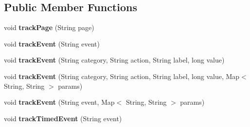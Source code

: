 \subsection*{Public Member Functions}
\begin{DoxyCompactItemize}
\item 
\hypertarget{classcom_1_1spilgames_1_1framework_1_1tracking_1_1impl_1_1_google_analytics_tracker_aa17767a7e23302cef04192a97665b6d6}{void {\bfseries track\-Page} (String page)}\label{classcom_1_1spilgames_1_1framework_1_1tracking_1_1impl_1_1_google_analytics_tracker_aa17767a7e23302cef04192a97665b6d6}

\item 
\hypertarget{classcom_1_1spilgames_1_1framework_1_1tracking_1_1impl_1_1_google_analytics_tracker_aca73bcda57495c0d6274c58d76669ced}{void {\bfseries track\-Event} (String event)}\label{classcom_1_1spilgames_1_1framework_1_1tracking_1_1impl_1_1_google_analytics_tracker_aca73bcda57495c0d6274c58d76669ced}

\item 
\hypertarget{classcom_1_1spilgames_1_1framework_1_1tracking_1_1impl_1_1_google_analytics_tracker_ac6322840330b5a35a9c22146ec5cbd1f}{void {\bfseries track\-Event} (String category, String action, String label, long value)}\label{classcom_1_1spilgames_1_1framework_1_1tracking_1_1impl_1_1_google_analytics_tracker_ac6322840330b5a35a9c22146ec5cbd1f}

\item 
\hypertarget{classcom_1_1spilgames_1_1framework_1_1tracking_1_1impl_1_1_google_analytics_tracker_a915e556f0016c568fcae2bd7785261a3}{void {\bfseries track\-Event} (String category, String action, String label, long value, Map$<$ String, String $>$ params)}\label{classcom_1_1spilgames_1_1framework_1_1tracking_1_1impl_1_1_google_analytics_tracker_a915e556f0016c568fcae2bd7785261a3}

\item 
\hypertarget{classcom_1_1spilgames_1_1framework_1_1tracking_1_1impl_1_1_google_analytics_tracker_aaa34a70dee15dcfd6e9d82e05e95ce49}{void {\bfseries track\-Event} (String event, Map$<$ String, String $>$ params)}\label{classcom_1_1spilgames_1_1framework_1_1tracking_1_1impl_1_1_google_analytics_tracker_aaa34a70dee15dcfd6e9d82e05e95ce49}

\item 
\hypertarget{classcom_1_1spilgames_1_1framework_1_1tracking_1_1impl_1_1_google_analytics_tracker_aeca0a30d0754d429889c3ef9e39a0762}{void {\bfseries track\-Timed\-Event} (String event)}\label{classcom_1_1spilgames_1_1framework_1_1tracking_1_1impl_1_1_google_analytics_tracker_aeca0a30d0754d429889c3ef9e39a0762}


\end{DoxyCompactItemize}
